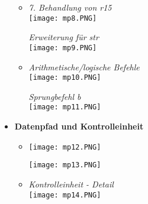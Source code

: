 \begin{itemize}
\begin{itemize}
\begin{minipage}{0.5\textwidth}
                    \end{minipage}
                \item[]
                    \begin{minipage}{0.4\textwidth}
                        \textit{7. Behandlung von r15} \\
                        \texttt{[image: mp8.PNG]}
                    \end{minipage}
                    \begin{minipage}{0.5\textwidth}
                        \textit{Erweiterung für str} \\
                        \texttt{[image: mp9.PNG]}
                    \end{minipage}
                \item[]
                    \begin{minipage}{0.4\textwidth}
                        \textit{Arithmetische/logische Befehle} \\
                        \texttt{[image: mp10.PNG]}
                    \end{minipage}
                    \begin{minipage}{0.5\textwidth}
                        \textit{Sprungbefehl b} \\
                        \texttt{[image: mp11.PNG]}
                    \end{minipage}
            \end{itemize}
        
        \item \textbf{Datenpfad und Kontrolleinheit}
            \begin{itemize}
                \item[]
                    \begin{minipage}{0.6\textwidth}
                        \texttt{[image: mp12.PNG]}
                    \end{minipage}
                    \begin{minipage}{0.3\textwidth}
                        \texttt{[image: mp13.PNG]}
                    \end{minipage}
                \item[]
                    \begin{minipage}{0.45\textwidth}
                        \textit{Kontrolleinheit - Detail} \\
                        \texttt{[image: mp14.PNG]}
                    \end{minipage}
            \end{itemize}


\end{itemize}
